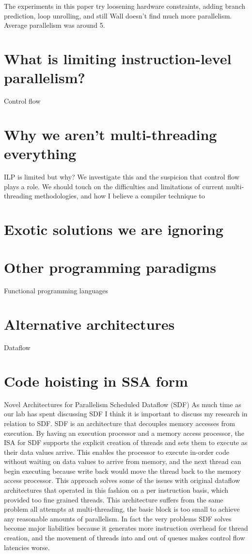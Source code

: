 \documentclass[12pt,twoside,letterpaper]{article}
\begin{document}
The experiments in this paper try loosening hardware constraints, adding branch prediction, loop unrolling, and still Wall doesn’t find much more parallelism. Average parallelism was around 5.



\section*{What is limiting instruction-level parallelism?}
Control flow
\section*{Why we aren't multi-threading everything}

ILP is limited but why? We investigate this and the suspicion that control flow plays a role. We should touch on the difficulties and limitations of current multi-threading methodologies, and how I believe a compiler technique to 


\section*{Exotic solutions we are ignoring}
\section*{Other programming paradigms}
Functional programming languages
\section*{Alternative architectures}
Dataflow

\section*{Code hoisting in SSA form}

Novel Architectures for Parallelism
Scheduled Dataflow (SDF)
As much time as our lab has spent discussing SDF I think it is important to discuss my research in relation to SDF. SDF is an architecture that decouples memory accesses from execution. By having an execution processor and a memory access processor, the ISA for SDF supports the explicit creation of threads and sets them to execute as their data values arrive. This enables the processor to execute in-order code without waiting on data values to arrive from memory, and the next thread can begin executing because write back would move the thread back to the memory access processor. This approach solves some of the issues with original dataflow architectures that operated in this fashion on a per instruction basis, which provided too fine grained threads. This architecture suffers from the same problem all attempts at multi-threading, the basic block is too small to achieve any reasonable amounts of parallelism. In fact the very problems SDF solves become major liabilities because it generates more instruction overhead for thread creation, and the movement of threads into and out of queues makes control flow latencies worse.
\end{document}
